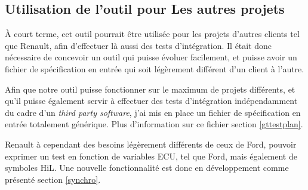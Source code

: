 	\subsection{Utilisation de l'outil pour Les autres projets}
	À court terme, cet outil pourrait être utilisée pour les projets d'autres clients tel que Renault, afin d'effectuer là aussi des tests d'intégration. Il était donc nécessaire de concevoir un outil qui puisse évoluer facilement, et puisse avoir un fichier de spécification en entrée qui soit légèrement différent d'un client à l'autre.
	
	Afin que notre outil puisse fonctionner sur le maximum de projets différents, et qu'il puisse également servir à effectuer des tests d'intégration indépendamment du cadre d'un \textit{third party software}, j'ai mis en place un fichier de spécification en entrée totalement générique. Plus d'information sur ce fichier section \ref{gttestplan}.
	
	Renault à cependant des besoins légèrement différents de ceux de Ford, pouvoir exprimer un test en fonction de variables ECU, tel que Ford, mais également de symboles HiL. Une nouvelle fonctionnalité est donc en développement comme présenté section \ref{synchro}.

%
%
%	
